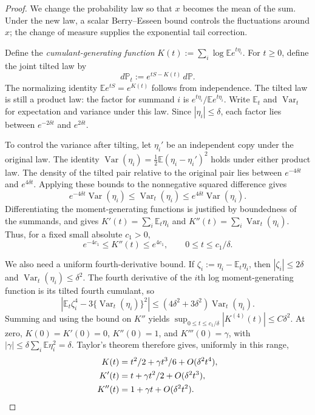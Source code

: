 \documentclass[11pt,letterpaper]{article}
\theoremstyle{remark}
\newcommand{\E}{\mathbb E}
\newcommand{\Pp}{\mathbb P}
\newcommand{\Var}{\operatorname{Var}}
\begin{document}
\begin{proof}
We change the probability law so that $x$ becomes the mean of the
sum. Under the new law, a scalar Berry--Esseen bound controls the
fluctuations around $x$; the change of measure supplies the
exponential tail correction.

Define the \emph{cumulant-generating function}
$K(t):=\sum_i\log\E e^{t\eta_i}$. For $t\ge0$, define the
joint tilted law by
\[
 d\Pp_t:=e^{tS-K(t)}\,d\Pp.
\]
The normalizing identity $\E e^{tS}=e^{K(t)}$ follows from
independence. The tilted law is still a product law: the factor
for summand $i$ is
$e^{t\eta_i}/\E e^{t\eta_i}$. Write $\E_t$ and $\Var_t$
for expectation and variance under this law. Since
$|\eta_i|\le\delta$, each factor lies between
$e^{-2\delta t}$ and $e^{2\delta t}$.

To control the variance after tilting, let $\eta_i'$ be an
independent copy under the original law. The identity
$\Var(\eta_i)=\tfrac12\E(\eta_i-\eta_i')^2$ holds under
either product law. The density of the tilted pair relative to
the original pair lies between $e^{-4\delta t}$ and
$e^{4\delta t}$. Applying these bounds to the nonnegative
squared difference gives
\[
 e^{-4\delta t}\Var(\eta_i)
 \le\Var_t(\eta_i)\le e^{4\delta t}\Var(\eta_i).
\]
Differentiating the moment-generating functions is justified by
boundedness of the summands, and gives
$K'(t)=\sum_i\E_t\eta_i$ and
$K''(t)=\sum_i\Var_t(\eta_i)$. Thus, for a fixed small
absolute $c_1>0$,
\[
 e^{-4c_1}\le K''(t)\le e^{4c_1},\qquad
 0\le t\le c_1/\delta.
\]

We also need a uniform fourth-derivative bound. If
$\zeta_i:=\eta_i-\E_t\eta_i$, then $|\zeta_i|\le2\delta$
and $\Var_t(\eta_i)\le\delta^2$. The fourth derivative of
the $i$th log moment-generating function is its tilted fourth
cumulant, so
\[
 \left|\E_t\zeta_i^4-3\{\Var_t(\eta_i)\}^2\right|
 \le(4\delta^2+3\delta^2)\Var_t(\eta_i).
\]
Summing and using the bound on $K''$ yields
$\sup_{0\le t\le c_1/\delta}|K^{(4)}(t)|\le C\delta^2$.
At zero, $K(0)=K'(0)=0$, $K''(0)=1$, and $K'''(0)=\gamma$,
with $|\gamma|\le\delta\sum_i\E\eta_i^2=\delta$.
Taylor's theorem therefore gives, uniformly in this range,
\begin{align}
 K(t)&=t^2/2+\gamma t^3/6+O(\delta^2t^4),\notag\\
 K'(t)&=t+\gamma t^2/2+O(\delta^2t^3),\notag\\
 K''(t)&=1+\gamma t+O(\delta^2t^2).
 \label{opt:cumulant-expansions}
\end{align}


\end{proof}
\end{document}
